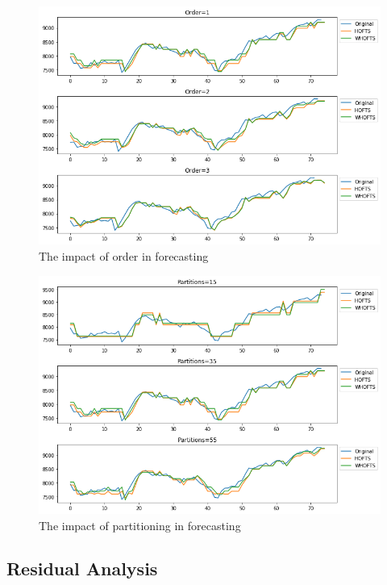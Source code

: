 \begin{figure}[htb]
    \centering
    \includegraphics[width=\textwidth]{figures/fts_order.png}
    \caption{The impact of order in forecasting}
    \label{fig:fts_order}
\end{figure}

\begin{figure}[htb]
    \centering
    \includegraphics[width=\textwidth]{figures/fts_partitions.png}
    \caption{The impact of partitioning in forecasting}
    \label{fig:fts_partitions}
\end{figure}

\subsection{Residual Analysis}
\label{sec:fts_residual}

